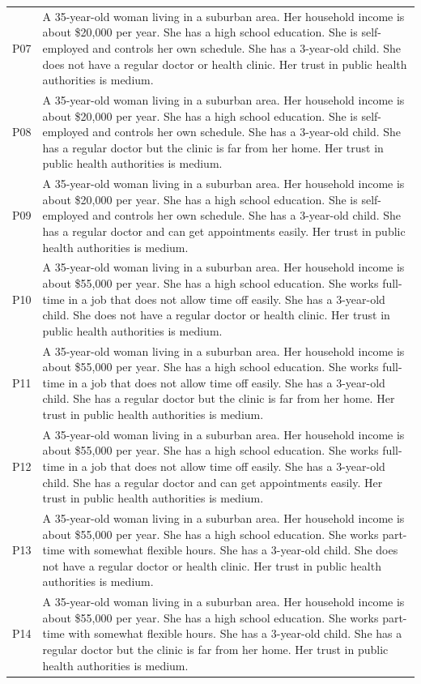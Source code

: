 \documentclass[11pt]{article}
\begin{document}
\begin{longtable}{p{1.2cm}p{12cm}}
P07 & A 35-year-old woman living in a suburban area. Her household income is about \$20,000 per year. She has a high school education. She is self-employed and controls her own schedule. She has a 3-year-old child. She does not have a regular doctor or health clinic. Her trust in public health authorities is medium. \\
P08 & A 35-year-old woman living in a suburban area. Her household income is about \$20,000 per year. She has a high school education. She is self-employed and controls her own schedule. She has a 3-year-old child. She has a regular doctor but the clinic is far from her home. Her trust in public health authorities is medium. \\
P09 & A 35-year-old woman living in a suburban area. Her household income is about \$20,000 per year. She has a high school education. She is self-employed and controls her own schedule. She has a 3-year-old child. She has a regular doctor and can get appointments easily. Her trust in public health authorities is medium. \\
P10 & A 35-year-old woman living in a suburban area. Her household income is about \$55,000 per year. She has a high school education. She works full-time in a job that does not allow time off easily. She has a 3-year-old child. She does not have a regular doctor or health clinic. Her trust in public health authorities is medium. \\
P11 & A 35-year-old woman living in a suburban area. Her household income is about \$55,000 per year. She has a high school education. She works full-time in a job that does not allow time off easily. She has a 3-year-old child. She has a regular doctor but the clinic is far from her home. Her trust in public health authorities is medium. \\
P12 & A 35-year-old woman living in a suburban area. Her household income is about \$55,000 per year. She has a high school education. She works full-time in a job that does not allow time off easily. She has a 3-year-old child. She has a regular doctor and can get appointments easily. Her trust in public health authorities is medium. \\
P13 & A 35-year-old woman living in a suburban area. Her household income is about \$55,000 per year. She has a high school education. She works part-time with somewhat flexible hours. She has a 3-year-old child. She does not have a regular doctor or health clinic. Her trust in public health authorities is medium. \\
P14 & A 35-year-old woman living in a suburban area. Her household income is about \$55,000 per year. She has a high school education. She works part-time with somewhat flexible hours. She has a 3-year-old child. She has a regular doctor but the clinic is far from her home. Her trust in public health authorities is medium. \\

\end{longtable}
\end{document}
